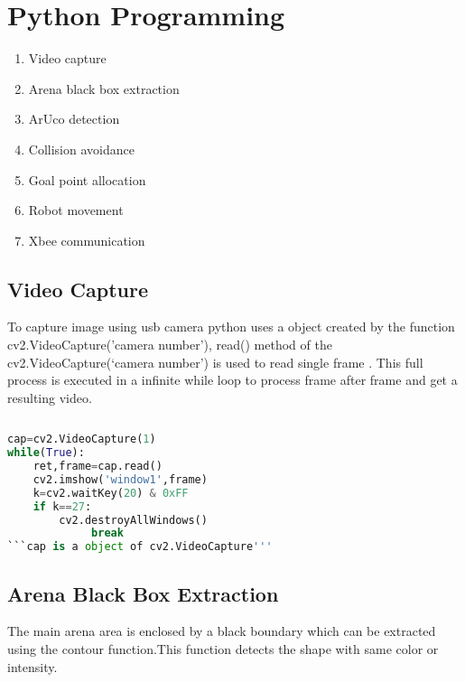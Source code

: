 \documentclass[main.tex]{subfiles}
\begin{document}
\chapter[Project Tag]{Python Programming}
	\begin{enumerate}
		\item Video capture
		\item Arena black box extraction
		\item ArUco detection
		\item Collision avoidance
		\item Goal point allocation
		\item Robot movement
		\item Xbee communication
	\end{enumerate}	

\section{Video Capture}

To capture image using usb camera python uses a object created by the function cv2.VideoCapture('camera number'),
read() method of the cv2.VideoCapture(`camera number') is used to read single frame .
This full process is executed in a infinite while loop to process frame after frame and get a resulting video.
\begin{lstlisting}[language=Python, caption = Capturing Video]
		
cap=cv2.VideoCapture(1)
while(True):
	ret,frame=cap.read()
	cv2.imshow('window1',frame)
	k=cv2.waitKey(20) & 0xFF
	if k==27:
		cv2.destroyAllWindows()
       		 break	
```cap is a object of cv2.VideoCapture'''
\end{lstlisting}
\pagebreak
\section{Arena Black Box Extraction}
The main arena area is enclosed by a black boundary which can be extracted using the contour function.This function detects the shape with same color or intensity.
\end{document}
